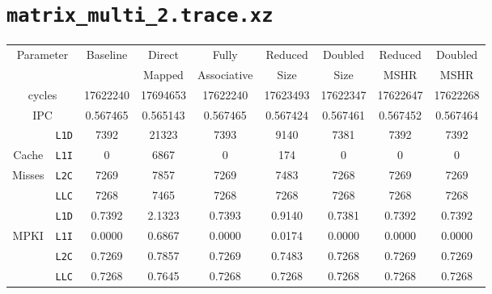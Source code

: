 \documentclass[11pt, swedish, openany]{book}
\begin{document}
\section{\texttt{matrix\_multi\_2.trace.xz}}
\begin{table}[H]
    \begin{tabular}{||c|c||c||c|c||c|c||c|c||}
        \hline
        \multicolumn{2}{||c||}{\multirow{2}{*}{Parameter}} & \multirow{2}{*}{Baseline} & Direct   & Fully       & Reduced  & Doubled  & Reduced  & Doubled  \\
        \multicolumn{2}{||c||}{}                           &                           & Mapped   & Associative & Size     & Size     & MSHR     & MSHR     \\
        \hline
        \multicolumn{2}{||c||}{cycles}                     & 17622240                  & 17694653 & 17622240    & 17623493 & 17622347 & 17622647 & 17622268 \\
        \multicolumn{2}{||c||}{IPC}                        & 0.567465                  & 0.565143 & 0.567465    & 0.567424 & 0.567461 & 0.567452 & 0.567464 \\
        \hline
                                            & \texttt{L1D} & 7392                      & 21323    & 7393        & 9140     & 7381     & 7392     & 7392     \\
        Cache                               & \texttt{L1I} & 0                         & 6867     & 0           & 174      & 0        & 0        & 0        \\
        Misses                              & \texttt{L2C} & 7269                      & 7857     & 7269        & 7483     & 7268     & 7269     & 7269     \\
                                            & \texttt{LLC} & 7268                      & 7465     & 7268        & 7268     & 7268     & 7268     & 7268     \\
        \hline
                                            & \texttt{L1D} & 0.7392                    & 2.1323   & 0.7393      & 0.9140   & 0.7381   & 0.7392   & 0.7392   \\
        \multirow{2}{*}{MPKI}               & \texttt{L1I} & 0.0000                    & 0.6867   & 0.0000      & 0.0174   & 0.0000   & 0.0000   & 0.0000   \\
                                            & \texttt{L2C} & 0.7269                    & 0.7857   & 0.7269      & 0.7483   & 0.7268   & 0.7269   & 0.7269   \\
                                            & \texttt{LLC} & 0.7268                    & 0.7645   & 0.7268      & 0.7268   & 0.7268   & 0.7268   & 0.7268   \\

\end{tabular}
\end{table}
\end{document}
